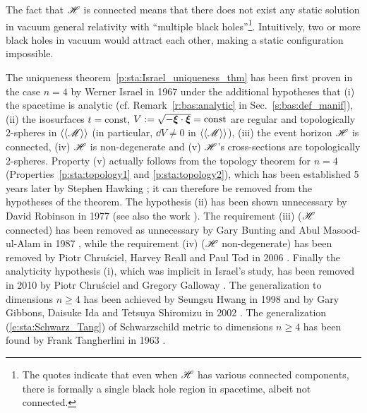 \begin{remark}
The fact that $\mathscr{H}$ is connected means that there does not exist any
static solution in vacuum general relativity with ``multiple black holes''\footnote{The quotes indicate that even when $\mathscr{H}$ has various connected components, there is
formally a single black hole region in spacetime, albeit not connected.}.
Intuitively, two or more black holes in vacuum would attract each other, making a static configuration impossible.
\end{remark}

\begin{hist}
\label{h:sta:Israel_thm_vacuum}
The uniqueness theorem~\ref{p:sta:Israel_uniqueness_thm}
has been first proven in the case $n=4$ by Werner Israel
in 1967 \cite{Israe67}
under the additional hypotheses that (i) the spacetime is analytic
(cf. Remark~\ref{r:bas:analytic} in Sec.~\ref{s:bas:def_manif}),
(ii) the isosurfaces $t=\mathrm{const}$, $V := \sqrt{-\bm{\xi}\cdot\bm{\xi}} = \mathrm{const}$
are regular and topologically 2-spheres in $\langle\langle \mathscr{M}\rangle\rangle$
(in particular, $\dd V \neq 0$ in $\langle\langle \mathscr{M}\rangle\rangle$),
(iii) the event horizon $\mathscr{H}$ is connected,
(iv) $\mathscr{H}$ is non-degenerate
and (v) $\mathscr{H}$'s cross-sections are topologically 2-spheres.
Property (v)
actually follows from the topology theorem for $n=4$ (Properties~\ref{p:sta:topology1}
and \ref{p:sta:topology2}), which has been established 5 years later by Stephen Hawking \cite{Hawki72}; it can therefore be removed from the hypotheses of the theorem.
The hypothesis (ii) has been shown unnecessary by David Robinson
in 1977 \cite{Robin77}
(see also the work \cite{MulleRS73}).
The requirement (iii) ($\mathscr{H}$ connected)
has been removed as unnecessary by Gary Bunting and
Abul Masood-ul-Alam in 1987 \cite{BuntiM87}, while the requirement (iv)
($\mathscr{H}$ non-degenerate) has been removed by
Piotr Chru\'sciel,
Harvey Reall and Paul Tod in 2006 \cite{ChrusRT06}.
Finally the analyticity hypothesis (i), which was implicit in Israel's study, has
been removed in 2010 by
Piotr Chru\'sciel and
Gregory Galloway \cite{ChrusG10}. The generalization to
dimensions $n\geq 4$ has been achieved by Seungsu Hwang in 1998 \cite{Hwang98}
and by Gary Gibbons, Daisuke Ida
and Tetsuya Shiromizu in 2002 \cite{GibboIS02b}.
The generalization (\ref{e:sta:Schwarz_Tang}) of Schwarzschild metric to dimensions
$n\geq 4$ has been found by
Frank Tangherlini in 1963 \cite{Tangh63}.
\end{hist}

